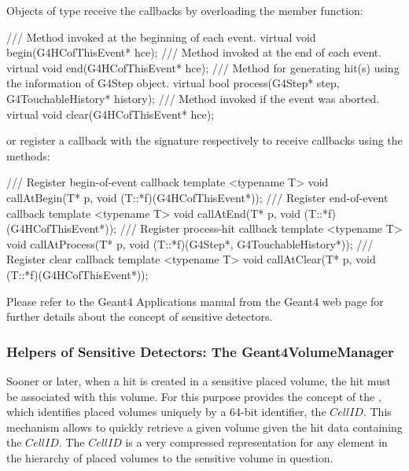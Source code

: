 \noindent
Objects of type  receive the callbacks by overloading the 
member function:
\begin{unnumberedcode}
  /// Method invoked at the beginning of each event.
  virtual void begin(G4HCofThisEvent* hce);
  /// Method invoked at the end of each event.
  virtual void end(G4HCofThisEvent* hce);
  /// Method for generating hit(s) using the information of G4Step object.
  virtual bool process(G4Step* step, G4TouchableHistory* history);
  /// Method invoked if the event was aborted.
  virtual void clear(G4HCofThisEvent* hce);
\end{unnumberedcode}
or register a callback with the signature {}
respectively {} 
to receive callbacks using the methods:
\begin{unnumberedcode}
  /// Register begin-of-event callback
  template <typename T> void callAtBegin(T* p, void (T::*f)(G4HCofThisEvent*));
  /// Register end-of-event callback
  template <typename T> void callAtEnd(T* p, void (T::*f)(G4HCofThisEvent*));
  /// Register process-hit callback
  template <typename T> void callAtProcess(T* p, void (T::*f)(G4Step*, G4TouchableHistory*));
  /// Register clear callback
  template <typename T> void callAtClear(T* p, void (T::*f)(G4HCofThisEvent*));
\end{unnumberedcode}
Please refer to the Geant4 Applications manual from the Geant4 web page for 
further details about the concept of sensitive detectors.

\subsubsection{Helpers of Sensitive Detectors: The Geant4VolumeManager}
\label{sec:ddg4-user-manual-geant4volumemanager}%

\noindent
Sooner or later, when a hit is created in a sensitive placed volume, the
hit must be associated with this volume. For this purpose \DDhep provides 
the concept of the , which identifies placed volumes uniquely 
by a 64-bit identifier, the $CellID$. This mechanism allows to quickly
retrieve a given volume given the hit data containing the $CellID$.
The $CellID$ is a very compressed representation for any element in the 
hierarchy of placed volumes to the sensitive volume in question.

